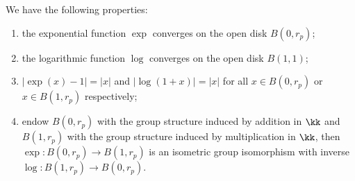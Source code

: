     \begin{proposition}\label{prop:fundamental_properties_of_p-adic_exp_and_log}
        We have the following properties:
        \begin{enumerate}
            \item the exponential function \(\exp\) converges on the open disk \(B(0, r_p)\);
            \item the logarithmic function \(\log\) converges on the open disk \(B(1, 1)\);
            \item \(|\exp(x)-1| = |x|\) and \(|\log(1+x)| = |x|\) for all \(x \in B(0,r_p)\) or \(x \in B(1,r_p)\) respectively;
            \item endow \(B(0, r_p)\) with the group structure induced by addition in \(\kk\) and \(B(1, r_p)\) with the group structure induced by multiplication in \(\kk\), then \(\exp: B(0, r_p) \to B(1, r_p)\) is an isometric group isomorphism with inverse \(\log: B(1, r_p) \to B(0, r_p)\).
        \end{enumerate}
    \end{proposition}
